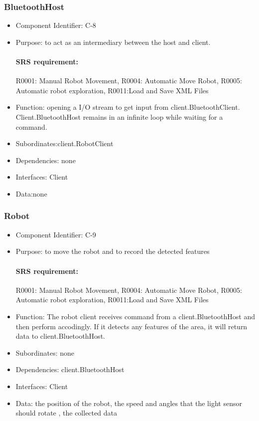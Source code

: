 \documentclass[11pt, a4paper]{report}
\begin{document}
\subsubsection{BluetoothHost}
\begin{itemize}
\item Component Identifier: C-8
\item Purpose: to act as an intermediary between the host and client.
\paragraph{SRS requirement:} R0001: Manual Robot Movement, R0004: Automatic Move Robot,
R0005: Automatic robot exploration, R0011:Load and Save XML Files
\item Function: opening a I/O stream to get input from client.BluetoothClient.
Client.BluetoothHost remains in an infinite loop while waiting for a command.
\item Subordinates:client.RobotClient
\item Dependencies: none
\item Interfaces: Client 
\item Data:none
\end{itemize}



\subsubsection{Robot}
\begin{itemize}
\item Component Identifier: C-9
\item Purpose: to move the robot and to record the detected features
\paragraph{SRS requirement:}R0001: Manual Robot Movement, R0004: Automatic Move Robot,
R0005: Automatic robot exploration, R0011:Load and Save XML Files
\item Function: The robot client receives command from a client.BluetoothHost and then perform 
accodingly. If it detects any features of the area, it will return data to client.BluetoothHost.
\item Subordinates: none
\item Dependencies: client.BluetoothHost
\item Interfaces:  Client
\item Data: the position of the robot, the speed and angles that the light sensor should rotate
, the collected data
\end{itemize}
\end{document}
